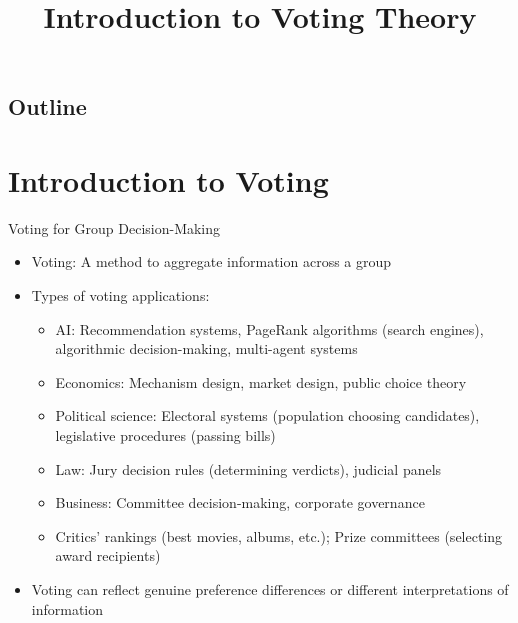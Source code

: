 \documentclass[10pt]{beamer}
\title{Introduction to Voting Theory}
\author{}
\date{}
\begin{document}
\begin{frame}
\titlepage
\end{frame}

\subsection*{Outline}
\begin{frame}
  \tableofcontents
\end{frame}

\section{Introduction to Voting}

\begin{frame}{Voting for Group Decision-Making}
  \begin{itemize}[<+->]
    \item Voting: A method to aggregate information across a group
    \item Types of voting applications:
      \begin{itemize}
        \item AI: Recommendation systems, PageRank algorithms (search engines), algorithmic decision-making, multi-agent systems
        \item Economics: Mechanism design, market design, public choice theory
        \item Political science: Electoral systems (population choosing candidates), legislative procedures (passing bills)
        \item Law: Jury decision rules (determining verdicts), judicial panels
        \item Business: Committee decision-making, corporate governance
        \item Critics' rankings (best movies, albums, etc.); Prize committees (selecting award recipients)
      \end{itemize}
    \item Voting can reflect genuine preference differences or different interpretations of information
  \end{itemize}
\end{frame}
\end{document}
